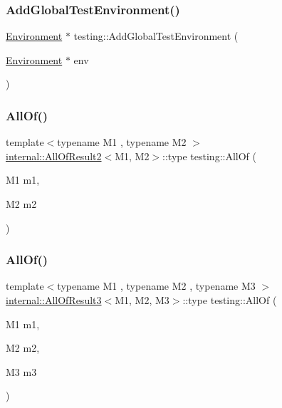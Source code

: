 \subsubsection{\texorpdfstring{AddGlobalTestEnvironment()}{AddGlobalTestEnvironment()}}
{\footnotesize\ttfamily \mbox{\hyperlink{classtesting_1_1_environment}{Environment}} $\ast$ testing\+::\+Add\+Global\+Test\+Environment (\begin{DoxyParamCaption}\item[{\mbox{\hyperlink{classtesting_1_1_environment}{Environment}} $\ast$}]{env }\end{DoxyParamCaption})\hspace{0.3cm}{\ttfamily [inline]}}

\mbox{\label{namespacetesting_af7618e8606c1cb45738163688944e2b7}} 
\subsubsection{\texorpdfstring{AllOf()}{AllOf()}\hspace{0.1cm}{\footnotesize\ttfamily [1/9]}}
{\footnotesize\ttfamily template$<$typename M1 , typename M2 $>$ \\
\mbox{\hyperlink{structtesting_1_1internal_1_1_all_of_result2}{internal\+::\+All\+Of\+Result2}}$<$M1, M2$>$\+::type testing\+::\+All\+Of (\begin{DoxyParamCaption}\item[{M1}]{m1,  }\item[{M2}]{m2 }\end{DoxyParamCaption})\hspace{0.3cm}{\ttfamily [inline]}}

\mbox{\label{namespacetesting_a75934d8ea6b986d2157a5ebfe68f9904}} 
\subsubsection{\texorpdfstring{AllOf()}{AllOf()}\hspace{0.1cm}{\footnotesize\ttfamily [2/9]}}
{\footnotesize\ttfamily template$<$typename M1 , typename M2 , typename M3 $>$ \\
\mbox{\hyperlink{structtesting_1_1internal_1_1_all_of_result3}{internal\+::\+All\+Of\+Result3}}$<$M1, M2, M3$>$\+::type testing\+::\+All\+Of (\begin{DoxyParamCaption}\item[{M1}]{m1,  }\item[{M2}]{m2,  }\item[{M3}]{m3 }\end{DoxyParamCaption})\hspace{0.3cm}{\ttfamily [inline]}}


